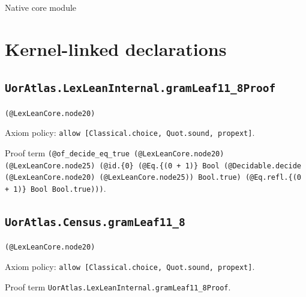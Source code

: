 \documentclass[11pt]{article}
\begin{document}
\begin{center}{\LARGE Native core module}\end{center}
\section*{Kernel-linked declarations}
\subsection*{\texttt{UorAtlas.LexLeanInternal.gramLeaf11\_8Proof}}
\noindent\texttt{(@LexLeanCore.node20)}\par
\noindent Axiom policy: \texttt{allow [Classical.choice, Quot.sound, propext]}.\par
\noindent Proof term \texttt{(@of\_decide\_eq\_true (@LexLeanCore.node20) (@LexLeanCore.node25) (@id.\{0\} (@Eq.\{(0 + 1)\} Bool (@Decidable.decide (@LexLeanCore.node20) (@LexLeanCore.node25)) Bool.true) (@Eq.refl.\{(0 + 1)\} Bool Bool.true)))}.\par
\subsection*{\texttt{UorAtlas.Census.gramLeaf11\_8}}
\noindent\texttt{(@LexLeanCore.node20)}\par
\noindent Axiom policy: \texttt{allow [Classical.choice, Quot.sound, propext]}.\par
\noindent Proof term \texttt{UorAtlas.LexLeanInternal.gramLeaf11\_8Proof}.\par
\end{document}

